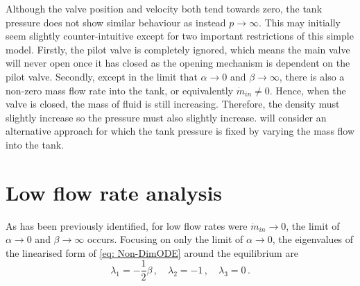 \newpage
Although the valve position and velocity both tend towards zero, the tank pressure does not show similar behaviour as instead $p \rightarrow \infty$. This may initially seem slightly counter-intuitive except for two important restrictions of this simple model. Firstly, the pilot valve is completely ignored, which means the main valve will never open once it has closed as the opening mechanism is dependent on the pilot valve. Secondly, except in the limit that $\alpha \rightarrow 0$ and $\beta \rightarrow \infty$, there is also a non-zero mass flow rate into the tank, or equivalently $\dot{m}_{in} \neq 0$. Hence, when the valve is closed, the mass of fluid is still increasing. Therefore, the density must slightly increase so the pressure must also slightly increase.  will consider an alternative approach for which the tank pressure is fixed by varying the mass flow into the tank.




\section{Low flow rate analysis}

As has been previously identified, for low flow rates were $\dot{m}_{in} \rightarrow 0$, the limit of $\alpha \rightarrow 0$ and $\beta \rightarrow \infty$ occurs. Focusing on only the limit of $\alpha \rightarrow 0$, the eigenvalues of the linearised form of \cref{eq: Non-DimODE} around the equilibrium are
~ %
\begin{equation*}
    \lambda_1 = - \frac{1}{2}\beta \, , \quad
    \lambda_2 = -1 \, , \quad
    \lambda_3 = 0 \, .
\end{equation*}

